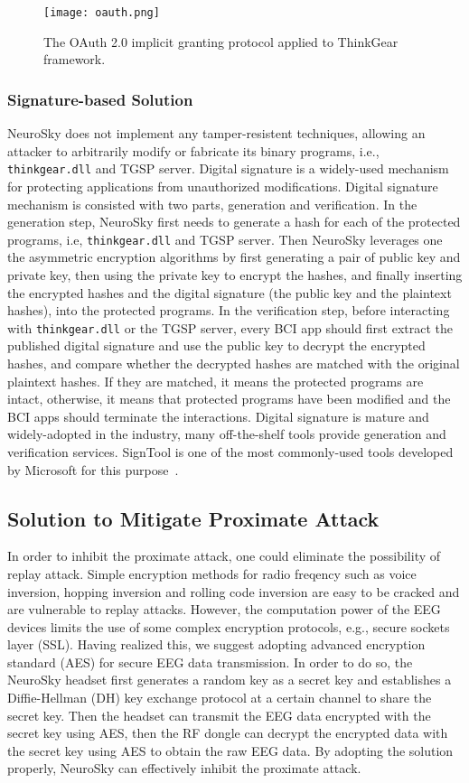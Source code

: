 \begin{figure}[!htb]
\hspace*{2cm}
        \texttt{[image: oauth.png]}
	\caption{The OAuth 2.0 implicit granting protocol applied to ThinkGear framework. }
        \label{fig:oauth}
\end{figure}

\subsubsection{Signature-based Solution}
NeuroSky does not implement any tamper-resistent techniques, allowing an attacker to arbitrarily modify or fabricate its binary programs, i.e., \texttt{thinkgear.dll} and TGSP server. Digital signature is a widely-used mechanism for protecting applications from unauthorized modifications. Digital signature mechanism is consisted with two parts, generation and verification. In the generation step, NeuroSky first needs to generate a hash for each of the protected programs, i.e, \texttt{thinkgear.dll} and TGSP server. Then NeuroSky leverages one the asymmetric encryption algorithms by first generating a pair of public key and private key, then using the private key to encrypt the hashes, and finally inserting the encrypted hashes and the digital signature (the public key and the plaintext hashes), into the protected programs. In the verification step, before interacting with \texttt{thinkgear.dll} or the TGSP server, every BCI app should first extract the published digital signature and use the public key to decrypt the encrypted hashes, and compare whether the decrypted hashes are matched with the original plaintext hashes. If they are matched, it means the protected programs are intact, otherwise, it means that protected programs have been modified and the BCI apps should terminate the interactions. Digital signature is mature and widely-adopted in the industry, many off-the-shelf tools provide generation and verification services. SignTool is one of the most commonly-used tools developed by Microsoft for this purpose~\cite{signtool}.

\subsection{Solution to Mitigate Proximate Attack}
In order to inhibit the proximate attack, one could eliminate the possibility of replay attack. Simple encryption methods for radio freqency such as voice inversion, hopping inversion and rolling code inversion are easy to be cracked and are vulnerable to replay attacks. However, the computation power of the EEG devices limits the use of some complex encryption protocols, e.g., secure sockets layer (SSL). Having realized this, we suggest adopting advanced encryption standard (AES) for secure EEG data transmission. In order to do so, the NeuroSky headset first generates a random key as a secret key and establishes a Diffie-Hellman (DH) key exchange protocol at a certain channel to share the secret key. Then the headset can transmit the EEG data encrypted with the secret key using AES, then the RF dongle can decrypt the encrypted data with the secret key using AES to obtain the raw EEG data. By adopting the solution properly, NeuroSky can effectively inhibit the proximate attack.
